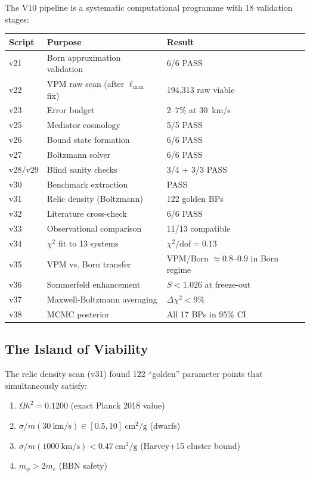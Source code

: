 \documentclass[12pt, a4paper]{article}
\begin{document}
The V10 pipeline is a systematic computational programme with 18 validation stages:

\begin{center}
\begin{longtable}{lll}
  \toprule
  Script & Purpose & Result \\
  \midrule
  v21 & Born approximation validation & 6/6 PASS \\
  v22 & VPM raw scan (after $\ell_\text{max}$ fix) & 194,313 raw viable \\
  v23 & Error budget & $2$--$7\%$ at $30$~km/s \\
  v25 & Mediator cosmology & 5/5 PASS \\
  v26 & Bound state formation & 6/6 PASS \\
  v27 & Boltzmann solver & 6/6 PASS \\
  v28/v29 & Blind sanity checks & 3/4 + 3/3 PASS \\
  v30 & Benchmark extraction & PASS \\
  v31 & Relic density (Boltzmann) & 122 golden BPs \\
  v32 & Literature cross-check & 6/6 PASS \\
  v33 & Observational comparison & 11/13 compatible \\
  v34 & $\chi^2$ fit to 13 systems & $\chi^2/\text{dof} = 0.13$ \\
  v35 & VPM vs. Born transfer & VPM/Born $\approx 0.8$--$0.9$ in Born regime \\
  v36 & Sommerfeld enhancement & $S < 1.026$ at freeze-out \\
  v37 & Maxwell-Boltzmann averaging & $\Delta\chi^2 < 9\%$ \\
  v38 & MCMC posterior & All 17 BPs in 95\% CI \\
  \bottomrule
\end{longtable}
\end{center}

\subsection{The Island of Viability}

The relic density scan (v31) found 122 ``golden'' parameter points that simultaneously satisfy:
\begin{enumerate}
  \item $\Omega h^2 = 0.1200$ (exact Planck 2018 value)
  \item $\sigma/m(30~\text{km/s}) \in [0.5, 10]~\text{cm}^2/\text{g}$ (dwarfs)
  \item $\sigma/m(1000~\text{km/s}) < 0.47~\text{cm}^2/\text{g}$ (Harvey+15 cluster bound)
  \item $m_\phi > 2m_e$ (BBN safety)
\end{enumerate}
\end{document}
